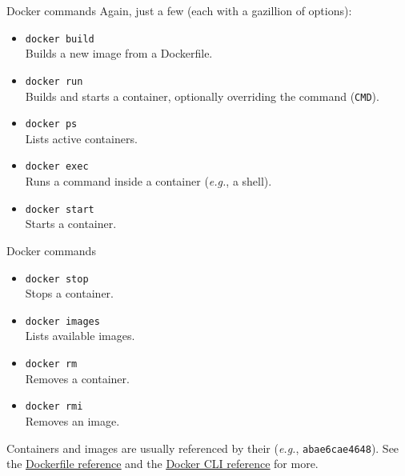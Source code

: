 \begin{frame}{Docker commands}
	Again, just a few (each with a gazillion of options):
	\begin{itemize}
		\item \texttt{docker build}\\Builds a new image from a Dockerfile.
		\item \texttt{docker run}\\Builds and starts a container, optionally overriding the command (\texttt{CMD}).
		\item \texttt{docker ps}\\Lists active containers.
		\item \texttt{docker exec}\\Runs a command inside a container (\emph{e.g.}, a shell).
		\item \texttt{docker start}\\Starts a container.
	\end{itemize}
\end{frame}
\begin{frame}{Docker commands}
	\begin{itemize}
		\item \texttt{docker stop}\\Stops a container.
		\item \texttt{docker images}\\Lists available images.
		\item \texttt{docker rm}\\Removes a container.
		\item \texttt{docker rmi}\\Removes an image.
	\end{itemize}
	Containers and images are usually referenced by their  (\emph{e.g.}, \texttt{abae6cae4648}).
	\newline\newline
	See the \href{https://docs.docker.com/engine/reference/builder/}{\color{blue}\underline{Dockerfile reference}} and the \href{https://docs.docker.com/engine/reference/commandline/docker/}{\color{blue}\underline{Docker CLI reference}} for more.
\end{frame}


